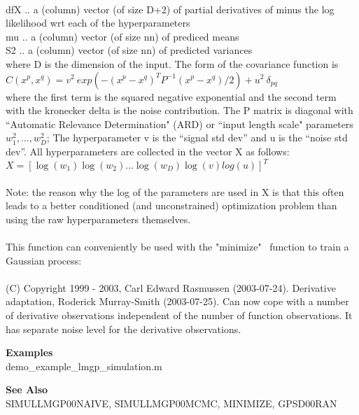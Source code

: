 \\ dfX     ..  a (column) vector (of size D+2) of partial
derivatives of minus the log likelihood wrt each of the
hyperparameters
\\ mu      ..  a (column) vector (of size nn) of prediced means
\\ S2      ..  a (column) vector (of size nn) of predicted variances
\\
 where D is the dimension of the input. The form of the
covariance function is
\\
$C(x^p,x^q) = v^2 \ exp \left( -(x^p - x^q)^T P^{-1}(x^p - x^q)/2
\right) + u^2 \ \delta_{pq}$
\\
 where the first term is the squared negative exponential and the
second term
 with the kronecker delta is the noise contribution. The P matrix
is diagonal
 with ``Automatic Relevance Determination" (ARD) or ``input length
scale"
 parameters $w_1^2,...,w_D^2$; The hyperparameter v is the
``signal std dev'' and
 u is the ``noise std dev''. All hyperparameters are collected in
the vector X
 as follows: $X = [ \log(w_1) \log(w_2) \dots \log(w_D) \log(v)
 log(u)]^T$
\\
\\ Note: the reason why the log of the parameters are used in X is that this
 often leads to a better conditioned (and unconstrained)
optimization problem
 than using the raw hyperparameters themselves.
\\
\\ This function can conveniently be used with the "minimize"  \ function to train
 a Gaussian process:
\\
\\ (C) Copyright 1999 - 2003, Carl Edward Rasmussen (2003-07-24).
 Derivative adaptation, Roderick Murray-Smith (2003-07-25). Can
now cope  with a number of derivative observations independent of
the number of
 function observations. It has separate noise level for the
derivative  observations.

\textbf{Examples}
\\ demo\_example\_lmgp\_simulation.m

\textbf{See Also}
\\ SIMULLMGP00NAIVE, SIMULLMGP00MCMC, MINIMIZE, GPSD00RAN
